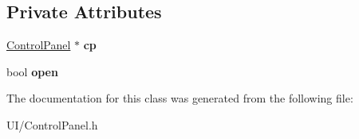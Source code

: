 \subsection*{Private Attributes}
\begin{DoxyCompactItemize}
\item 
\hypertarget{classControlPanelButton_af324dcbcd32fdd7e7a1636ba8749f1c1}{\hyperlink{classControlPanel}{Control\-Panel} $\ast$ {\bfseries cp}}\label{classControlPanelButton_af324dcbcd32fdd7e7a1636ba8749f1c1}

\item 
\hypertarget{classControlPanelButton_a8963abee7f6d639bf0f192532d465f95}{bool {\bfseries open}}\label{classControlPanelButton_a8963abee7f6d639bf0f192532d465f95}

\end{DoxyCompactItemize}


The documentation for this class was generated from the following file\-:\begin{DoxyCompactItemize}
\item 
U\-I/Control\-Panel.\-h\end{DoxyCompactItemize}
